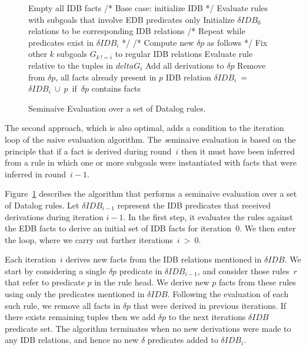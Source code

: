 \begin{figure}
\ssp
\begin{boxedminipage}{\linewidth}
    \begin{algorithmic}[1]
      	\STATE Empty all IDB facts
	\STATE /* Base case: initialize IDB */
        \STATE Evaluate rules with subgoals that involve EDB predicates only
	\STATE Initialize $\delta IDB_0$ relations to be corresponding IDB relations
	\STATE /* Repeat while predicates exist in $\delta IDB_i$ */
                	\STATE /* Compute new $\delta p$ as follows */
				\STATE Fix other $k$ subgoals $G_{k\ != i}$ to regular IDB relations
				\STATE Evaluate rule relative to the tuples in $delta G_i$ 
				\STATE Add all derivations to $\delta p$
			\ENDFOR
        	\ENDFOR
		\STATE Remove from $\delta p$, all facts already present in $p$ IDB relation
		\STATE $\delta IDB_i$\ =\ $\delta IDB_i\ \cup\ p$\ if\ $\delta p$ contains facts
        \ENDFOR
	\ENDWHILE
    \end{algorithmic}
\end{boxedminipage}
\caption{\label{ch:p2:fig:seminaive}Seminaive Evaluation over a set of Datalog rules.}
\end{figure}

The second approach, which is also optimal, adds a condition to the iteration
loop of the {\emph naive evaluation} algorithm.  The {\emph seminaive
evaluation} is based on the principle that if a fact is derived during
round~$i$ then it must have been inferred from a rule in which one or more
subgoals were instantiated with facts that were inferred in round~$i-1$.

Figure~\ref{ch:p2:fig:seminaive} describes the algorithm that performs a
seminaive evaluation over a set of Datalog rules.  Let $\delta IDB_{i-1}$
represent the IDB predicates that received derivations during iteration $i-1$.
In the first step, it evaluates the rules against the EDB facts to derive an
initial set of IDB facts for iteration~$0$.  We then enter the loop, where we
carry out further iterations~$i\ >\ 0$.

Each iteration~$i$ derives new facts from the IDB relations mentioned in
$\delta IDB$.  We start by considering a single $\delta p$ predicate in $\delta
IDB_{i-1}$, and consider those rules~$r$ that refer to predicate $p$ in the
rule head.  We derive new $p$ facts from these rules using only the predicates
mentioned in $\delta IDB$.  Following the evaluation of each such rule, we
remove all facts in $\delta p$ that were derived in previous iterations.  If
there exists remaining tuples then we add $\delta p$ to the next iterations
$\delta IDB$ predicate set.  The algorithm terminates when no new derivations
were made to any IDB relations, and hence no new $\delta$ predicates added to
$\delta IDB_i$.


